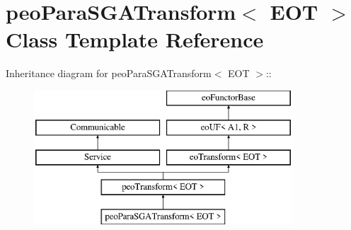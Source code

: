 \hypertarget{classpeoParaSGATransform}{
\section{peo\-Para\-SGATransform$<$ EOT $>$ Class Template Reference}
\label{classpeoParaSGATransform}
}
Inheritance diagram for peo\-Para\-SGATransform$<$ EOT $>$::\begin{figure}[H]
\begin{center}
\leavevmode
\includegraphics[height=5cm]{classpeoParaSGATransform}
\end{center}
\end{figure}
